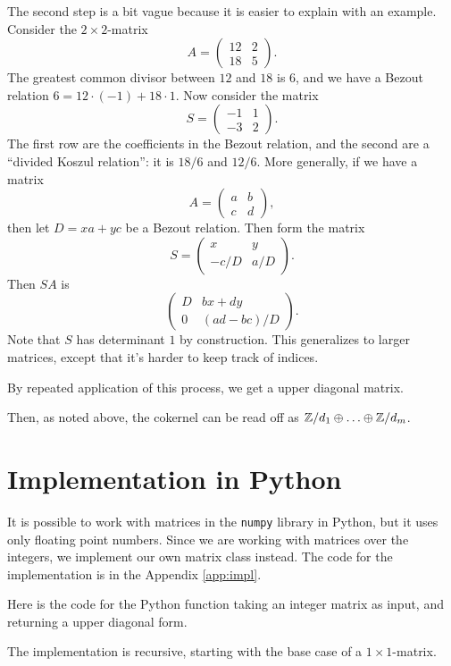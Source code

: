 \documentclass[11pt, english]{article}
\begin{document}
The second step is a bit vague because it is easier to explain with an example. Consider the $2 \times 2$-matrix 
$$
A = 
\begin{pmatrix}
12 & 2 \\
18 & 5
\end{pmatrix}.
$$
The greatest common divisor between $12$ and $18$ is $6$, and we have a Bezout relation $6=12 \cdot (-1) + 18 \cdot 1$. Now consider the matrix
$$
S = 
\begin{pmatrix}
-1 & 1 \\
-3 & 2
\end{pmatrix}.
$$
The first row are the coefficients in the Bezout relation, and the second are a ``divided Koszul relation'': it is $18/6$ and $12/6$. More generally, if we have a matrix
$$
A = 
\begin{pmatrix}
a & b \\ c & d
\end{pmatrix},
$$
then let $D=xa+yc$ be a Bezout relation. Then form the matrix
$$
S = 
\begin{pmatrix}
x & y \\
-c/D & a/D
\end{pmatrix}. 
$$
Then $SA$ is 
$$
\begin{pmatrix}
D & bx+dy \\
0 & (ad-bc)/D
\end{pmatrix}.
$$
Note that $S$ has determinant $1$ by construction. This generalizes to larger matrices, except that it's harder to keep track of indices. 

By repeated application of this process, we get a upper diagonal matrix.

Then, as noted above, the cokernel can be read off as $\mathbb{Z}/d_1 \oplus \ldots \oplus \mathbb{Z}/d_m$. 

\section{Implementation in Python}

It is possible to work with matrices in the \verb'numpy' library in Python, but it uses only floating point numbers. Since we are working with matrices over the integers, we implement our own matrix class instead. The code for the  implementation is in the Appendix \ref{app:impl}.

Here is the code for the Python function taking an integer matrix as input, and returning a upper diagonal form.

The implementation is recursive, starting with the base case of a  $1 \times 1$-matrix.
\end{document}
